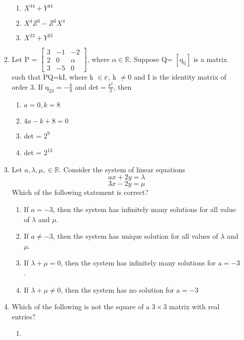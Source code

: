 \documentclass[journal,12pt,twocolumn]{IEEEtran}
\theoremstyle{remark}
\begin{document}
\begin{enumerate}
\begin{enumerate}
\begin{enumerate}
						\item $X^{44} + Y^{44}$
						\item $X^4Z^3 -Z^3X^4$
						\item $X^{23} + Y^{23}$
					\end{enumerate}
					\hfill {}
				\item 
					Let P = 
						$\begin{bmatrix}
							3 & -1 & -2\\
							2 & 0 & \alpha\\
							3 & -5 & 0
						\end{bmatrix}$,
					where $\alpha \in \mathbb{R}$. Suppose Q= $\mathrm{[q_{ij}]}$ is a matrix such that PQ=kI, where k $\in \mathbb{r}$, k $\neq 0$ and I is the identity matrix of order $3$. If $\mathrm{q_{23}} = -\frac{k}{8}$ and det$= \frac{k^2}{2}$, then
					\begin{enumerate}
						\item $a=0, k=8$
						\item $4a-k+8=0$
						\item det  = $2^9$
						\item det  = $2^{13}$
					\end{enumerate}
					\hfill {}
				\item
					Let $a, \lambda, \mu, \in \mathbb{R}$. Consider the system of linear equations $$ax+2y=\lambda$$ $$3x-2y=\mu$$ Which of the following statement is  correct?
					\begin{enumerate}
						\item If $a=-3$, then the system has infinitely many solutions for all value of $\lambda$ and $\mu$.
						\item If $a \neq -3$, then the system has unique solution for all values of $\lambda$ and $\mu$.
						\item If $\lambda + \mu = 0$, then the system has infinitely many solutions for $\mathrm{a} = -3$.
						\item If $\lambda + \mu \neq 0$, then the system has no solution for $\mathrm{a} = -3$
					\end{enumerate}
					\hfill {}
				\item 
					Which of the following is  not the square of a $3 \times 3$ matrix with real entries?
						\begin{enumerate}
							\item 

\end{enumerate}
\end{enumerate}
\end{enumerate}
\end{document}
